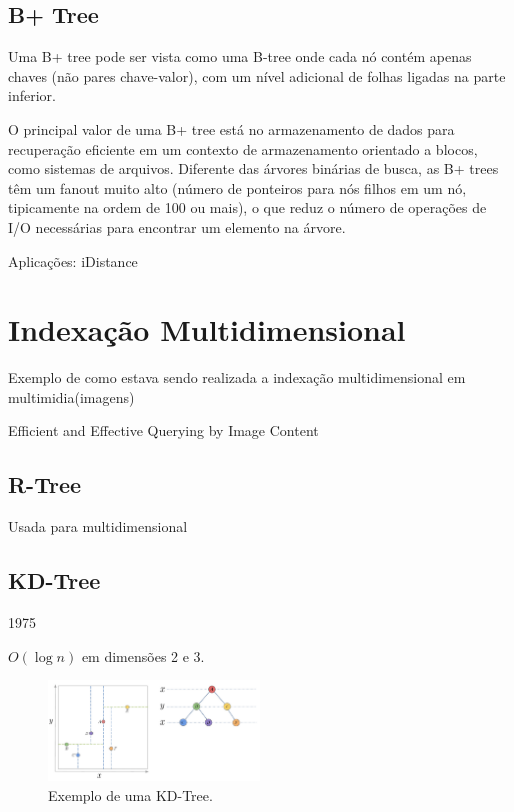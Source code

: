 \cite{btree:wiki,btree:comer1979,btree:bayer1970}

\subsection{B+ Tree}

Uma B+ tree pode ser vista como uma B-tree onde cada nó contém apenas chaves (não pares chave-valor), com um nível adicional de folhas ligadas na parte inferior.

O principal valor de uma B+ tree está no armazenamento de dados para recuperação eficiente em um contexto de armazenamento orientado a blocos, como sistemas de arquivos. Diferente das árvores binárias de busca, as B+ trees têm um fanout muito alto (número de ponteiros para nós filhos em um nó, tipicamente na ordem de 100 ou mais), o que reduz o número de operações de I/O necessárias para encontrar um elemento na árvore.

Aplicações: iDistance

\cite{bptree:wiki}

\section{Indexação Multidimensional}
\label{sec:multidimsearch}

Exemplo de como estava sendo realizada a indexação multidimensional em multimidia(imagens)

Efficient and Effective Querying by Image Content

\subsection{R-Tree}

Usada para multidimensional

\subsection{KD-Tree}

1975 \cite{kdtree:wiki,kdtree:bentley1975}

$O(\log n)$ em dimensões 2 e 3.

\begin{figure}
    \centering
    \includegraphics[width=0.5\textwidth]{imgs/kdtree.png}
    \caption{Exemplo de uma KD-Tree.}
    \label{fig:kdtree}
\end{figure}

